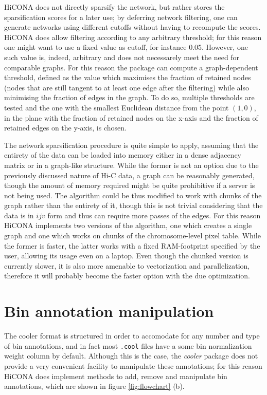 HiCONA does not directly sparsify the network, but rather stores the sparsification scores for a later use; by deferring network filtering, one can generate networks using different cutoffs without having to recompute the scores. HiCONA does allow filtering according to any arbitrary threshold; for this reason one might want to use a fixed value as cutoff, for instance 0.05. However, one such value is, indeed, arbitrary and does not necessarely meet the need for comparable graphs. For this reason the package can compute a graph-dependent threshold, defined as the value which maximises the fraction of retained nodes (nodes that are still tangent to at least one edge after the filtering) while also minimising the fraction of edges in the graph. To do so, multiple thresholds are tested and the one with the smallest Euclidean distance from the point $(1,0)$, in the plane with the fraction of retained nodes on the x-axis and the fraction of retained edges on the y-axis, is chosen.

The network sparsification procedure is quite simple to apply, assuming that the entirety of the data can be loaded into memory either in a dense adjacency matrix or in a graph-like structure. While the former is not an option due to the previously discussed nature of Hi-C data, a graph can be reasonably generated, though the amount of memory required might be quite prohibitive if a server is not being used. The algorithm could be thus modified to work with chunks of the graph rather than the entirety of it, though this is not trivial considering that the data is in $ijv$ form and thus can require more passes of the edges. For this reason HiCONA implements two versions of the algorithm, one which creates a single graph and one which works on chunks of the chromosome-level pixel table. While the former is faster, the latter works with a fixed RAM-footprint specified by the user, allowing its usage even on a laptop. Even though the chunked version is currently slower, it is also more amenable to vectorization and parallelization, therefore it will probably become the faster option with the due optimization.

\section{Bin annotation manipulation}

The cooler format is structured in order to accomodate for any number and type of bin annotations, and in fact most \texttt{.cool} files have a some bin normalization weight column by default. Although this is the case, the \emph{cooler} package does not provide a very convenient facility to manipulate these annotations; for this reason HiCONA does implement methods to add, remove and manipulate bin annotations, which are shown in figure \ref{fig:flowchart} (b). 

